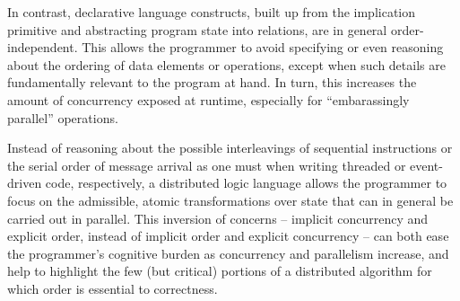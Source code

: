 

In contrast, declarative language constructs, built up from the
implication primitive and abstracting program state into relations,
are in general order-independent.  This allows the programmer to avoid
specifying or even reasoning about the ordering of data elements or
operations, except when such details are fundamentally relevant to the
program at hand.  In turn, this increases the amount of concurrency
exposed at runtime, especially for ``embarassingly parallel''
operations.


Instead of reasoning about the possible interleavings of sequential
instructions or the serial order of message arrival as one must when writing threaded or 
event-driven code, respectively, a distributed logic language allows the programmer to focus
on the admissible, atomic transformations over state that can in general be carried out in
parallel.  This inversion of concerns -- implicit concurrency and explicit order, instead of
implicit order and explicit concurrency -- can both ease the programmer's cognitive burden as
concurrency and parallelism increase, and help to highlight the few (but critical) 
portions of a distributed algorithm for which order is essential to correctness.

